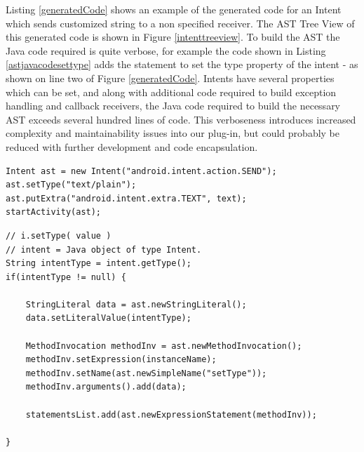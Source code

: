 Listing \ref{generatedCode} shows an example of the generated code for an Intent which sends customized string to a non specified receiver. The AST Tree View of this generated code is shown in Figure \ref{intenttreeview}. To build the AST the Java code required is quite verbose, for example the code shown in Listing \ref{astjavacodesettype} adds the statement to set the type property of the intent - as shown on line two of Figure \ref{generatedCode}. Intents have several properties which can be set, and along with additional code required to build exception handling and callback receivers, the Java code required to build the necessary AST exceeds several hundred lines of code. This verboseness introduces increased complexity and maintainability issues into our plug-in, but could probably be reduced with further development and code encapsulation.

{\footnotesize\begin{lstlisting}[label=generatedCode,caption=Generated code of an Intent]
Intent ast = new Intent("android.intent.action.SEND");
ast.setType("text/plain");
ast.putExtra("android.intent.extra.TEXT", text);
startActivity(ast);		
\end{lstlisting}}

{\footnotesize\begin{lstlisting}[label=astjavacodesettype,caption=Java code to set type property]
// i.setType( value )
// intent = Java object of type Intent.
String intentType = intent.getType();
if(intentType != null) {

	StringLiteral data = ast.newStringLiteral();
	data.setLiteralValue(intentType);
	
	MethodInvocation methodInv = ast.newMethodInvocation();
	methodInv.setExpression(instanceName);
	methodInv.setName(ast.newSimpleName("setType"));
	methodInv.arguments().add(data);
	
	statementsList.add(ast.newExpressionStatement(methodInv));
	
}		
\end{lstlisting}}